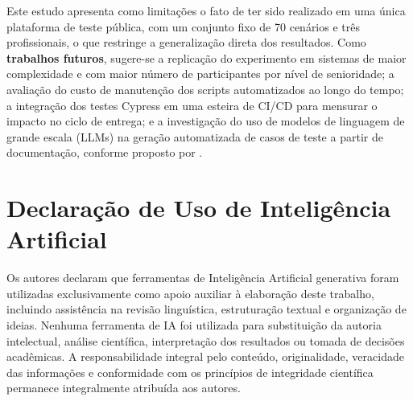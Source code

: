 \documentclass{UNESC}
\begin{document}
Este estudo apresenta como limitações o fato de ter sido realizado em uma única plataforma de teste pública, com um conjunto fixo de 70 cenários e três profissionais, o que restringe a generalização direta dos resultados. Como \textbf{trabalhos futuros}, sugere-se a replicação do experimento em sistemas de maior complexidade e com maior número de participantes por nível de senioridade; a avaliação do custo de manutenção dos scripts automatizados ao longo do tempo; a integração dos testes Cypress em uma esteira de CI/CD para mensurar o impacto no ciclo de entrega; e a investigação do uso de modelos de linguagem de grande escala (LLMs) na geração automatizada de casos de teste a partir de documentação, conforme proposto por .

\section*{Declaração de Uso de Inteligência Artificial}
Os autores declaram que ferramentas de Inteligência Artificial generativa foram utilizadas exclusivamente como apoio auxiliar à elaboração deste trabalho, incluindo assistência na revisão linguística, estruturação textual e organização de ideias. Nenhuma ferramenta de IA foi utilizada para substituição da autoria intelectual, análise científica, interpretação dos resultados ou tomada de decisões acadêmicas. A responsabilidade integral pelo conteúdo, originalidade, veracidade das informações e conformidade com os princípios de integridade científica permanece integralmente atribuída aos autores.


\renewcommand{\refname}{REFERÊNCIAS}
 
\end{document}
